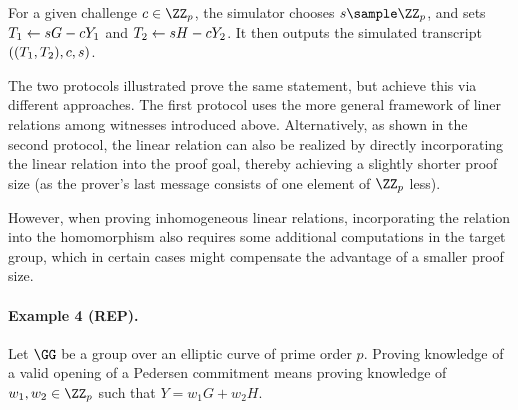 \documentclass[runningheads]{llncs}
\begin{document}
For a given challenge $c\in\ZZ_p$, the simulator chooses $s\sample\ZZ_p$, and sets $T_1\gets sG-cY_1$ and $T_2\gets sH - cY_2$.
It then outputs the simulated transcript $((T_1,T_2),c,s)$.


\begin{remark}
  The two protocols illustrated prove the same statement, but achieve this via different approaches.
  The first protocol uses the more general framework of liner relations among witnesses introduced above.
  Alternatively, as shown in the second protocol, the linear relation can also be realized by  directly incorporating the linear relation into the proof goal, thereby achieving a slightly shorter proof size (as the prover's last message consists of one element of $\ZZ_p$ less).

  However, when proving inhomogeneous linear relations, incorporating the relation into the homomorphism also requires some additional computations in the target group, which in certain cases might compensate the advantage of a smaller proof size.
\end{remark}

\paragraph{Example 4 (REP).}
Let $\GG$ be a group over an elliptic curve of prime order $p$.
Proving knowledge of a valid opening of a Pedersen commitment means proving knowledge of $w_1,w_2\in\ZZ_p$ such that $Y=w_1G + w_2H$.
\end{document}
